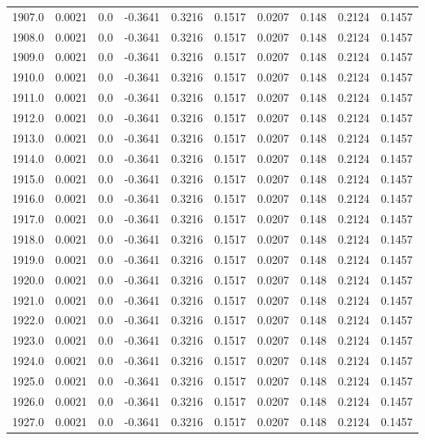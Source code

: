 \begin{longtable}{lrrrrrrrrr}
1907.0 & 0.0021 & 0.0 & -0.3641 & 0.3216 & 0.1517 & 0.0207 & 0.148 & 0.2124 & 0.1457 \\
1908.0 & 0.0021 & 0.0 & -0.3641 & 0.3216 & 0.1517 & 0.0207 & 0.148 & 0.2124 & 0.1457 \\
1909.0 & 0.0021 & 0.0 & -0.3641 & 0.3216 & 0.1517 & 0.0207 & 0.148 & 0.2124 & 0.1457 \\
1910.0 & 0.0021 & 0.0 & -0.3641 & 0.3216 & 0.1517 & 0.0207 & 0.148 & 0.2124 & 0.1457 \\
1911.0 & 0.0021 & 0.0 & -0.3641 & 0.3216 & 0.1517 & 0.0207 & 0.148 & 0.2124 & 0.1457 \\
1912.0 & 0.0021 & 0.0 & -0.3641 & 0.3216 & 0.1517 & 0.0207 & 0.148 & 0.2124 & 0.1457 \\
1913.0 & 0.0021 & 0.0 & -0.3641 & 0.3216 & 0.1517 & 0.0207 & 0.148 & 0.2124 & 0.1457 \\
1914.0 & 0.0021 & 0.0 & -0.3641 & 0.3216 & 0.1517 & 0.0207 & 0.148 & 0.2124 & 0.1457 \\
1915.0 & 0.0021 & 0.0 & -0.3641 & 0.3216 & 0.1517 & 0.0207 & 0.148 & 0.2124 & 0.1457 \\
1916.0 & 0.0021 & 0.0 & -0.3641 & 0.3216 & 0.1517 & 0.0207 & 0.148 & 0.2124 & 0.1457 \\
1917.0 & 0.0021 & 0.0 & -0.3641 & 0.3216 & 0.1517 & 0.0207 & 0.148 & 0.2124 & 0.1457 \\
1918.0 & 0.0021 & 0.0 & -0.3641 & 0.3216 & 0.1517 & 0.0207 & 0.148 & 0.2124 & 0.1457 \\
1919.0 & 0.0021 & 0.0 & -0.3641 & 0.3216 & 0.1517 & 0.0207 & 0.148 & 0.2124 & 0.1457 \\
1920.0 & 0.0021 & 0.0 & -0.3641 & 0.3216 & 0.1517 & 0.0207 & 0.148 & 0.2124 & 0.1457 \\
1921.0 & 0.0021 & 0.0 & -0.3641 & 0.3216 & 0.1517 & 0.0207 & 0.148 & 0.2124 & 0.1457 \\
1922.0 & 0.0021 & 0.0 & -0.3641 & 0.3216 & 0.1517 & 0.0207 & 0.148 & 0.2124 & 0.1457 \\
1923.0 & 0.0021 & 0.0 & -0.3641 & 0.3216 & 0.1517 & 0.0207 & 0.148 & 0.2124 & 0.1457 \\
1924.0 & 0.0021 & 0.0 & -0.3641 & 0.3216 & 0.1517 & 0.0207 & 0.148 & 0.2124 & 0.1457 \\
1925.0 & 0.0021 & 0.0 & -0.3641 & 0.3216 & 0.1517 & 0.0207 & 0.148 & 0.2124 & 0.1457 \\
1926.0 & 0.0021 & 0.0 & -0.3641 & 0.3216 & 0.1517 & 0.0207 & 0.148 & 0.2124 & 0.1457 \\
1927.0 & 0.0021 & 0.0 & -0.3641 & 0.3216 & 0.1517 & 0.0207 & 0.148 & 0.2124 & 0.1457 \\

\end{longtable}
